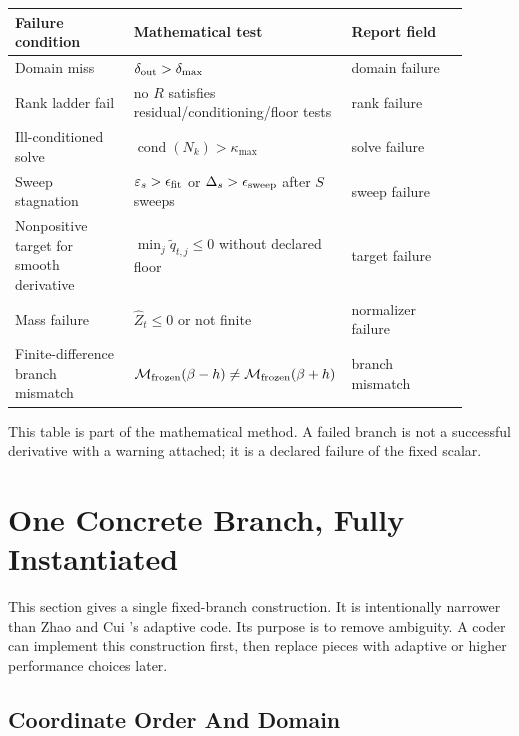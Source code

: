 \documentclass[11pt]{article}
\numberwithin{equation}{section}
\begin{document}
\begin{center}
\begin{tabular}{p{0.28\linewidth}p{0.34\linewidth}p{0.28\linewidth}}
\toprule
Failure condition & Mathematical test & Report field\\
\midrule
Domain miss &
\(\delta_{\rm out}>\delta_{\max}\) &
domain failure\\
Rank ladder fail &
no \(R\) satisfies residual/conditioning/floor tests &
rank failure\\
Ill-conditioned solve &
\(\operatorname{cond}(N_k)>\kappa_{\max}\) &
solve failure\\
Sweep stagnation &
\(\varepsilon_s>\epsilon_{\rm fit}\) or \(\Delta_s>\epsilon_{\rm sweep}\) after \(S\) sweeps &
sweep failure\\
Nonpositive target for smooth derivative &
\(\min_j\widetilde q_{t,j}\le0\) without declared floor &
target failure\\
Mass failure &
\(\widehat Z_t\le0\) or not finite &
normalizer failure\\
Finite-difference branch mismatch &
\(\mathcal M_{\rm frozen}(\beta-h)\ne\mathcal M_{\rm frozen}(\beta+h)\) &
branch mismatch\\
\bottomrule
\end{tabular}
\end{center}

This table is part of the mathematical method.  A failed branch is not a
successful derivative with a warning attached; it is a declared failure of the
fixed scalar.

\section{One Concrete Branch, Fully Instantiated}

This section gives a single fixed-branch construction.  It is intentionally narrower
than Zhao and Cui \cite{zhao2024ttsequential}'s adaptive code.  Its purpose is to remove ambiguity.  A coder
can implement this construction first, then replace pieces with adaptive or higher
performance choices later.

\subsection{Coordinate Order And Domain}
\end{document}
